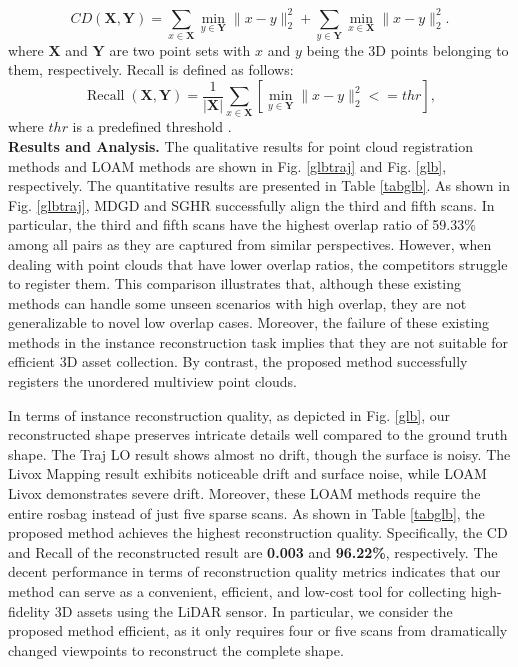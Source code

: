 \begin{equation}
CD\left(\boldsymbol{X}, \boldsymbol{Y}\right)=\sum_{x \in \boldsymbol{X}} \min _{y \in \boldsymbol{Y}}\|x-y\|_2^2+\sum_{y \in \boldsymbol{Y}} \min _{x \in \boldsymbol{X}}\|x-y\|_2^2. \label{cd}
\end{equation} 
where $\boldsymbol{X}$ and $\boldsymbol{Y}$ are two point sets with $x$ and $y$ being the 3D points belonging to them, respectively. Recall is defined as follows:
\begin{equation}
\operatorname{Recall}(\boldsymbol{X}, \boldsymbol{Y})=\frac{1}{|\boldsymbol{X}|} \sum_{x \in \boldsymbol{X}}\left[\min _{y \in \boldsymbol{Y}}\|x-y\|_2^2<=thr\right],
\end{equation}
where $thr$ is a predefined threshold \cite{cd}.
\\
\noindent\textbf{Results and Analysis.}
The qualitative results for point cloud registration methods and LOAM methods are shown in Fig. \ref{glbtraj} and Fig. \ref{glb}, respectively. The quantitative results are presented in Table \ref{tabglb}. As shown in Fig. \ref{glbtraj}, MDGD \cite{mdgd} and SGHR \cite{sghr} successfully align the third and fifth scans. In particular, the third and fifth scans have the highest overlap ratio of 59.33\% among all pairs as they are captured from similar perspectives. However, when dealing with point clouds that have lower overlap ratios, the competitors \cite{mdgd,sghr,se3et,geotransformer,teaser} struggle to register them. This comparison illustrates that, although these existing methods can handle some unseen scenarios with high overlap, they are not generalizable to novel low overlap cases.
Moreover, the failure of these existing methods in the instance reconstruction task implies that they are not suitable for efficient 3D asset collection. By contrast, the proposed method successfully registers the unordered multiview point clouds. 
\par
In terms of instance reconstruction quality, as depicted in Fig. \ref{glb}, our reconstructed shape preserves intricate details well compared to the ground truth shape. The Traj LO \cite{traj} result shows almost no drift, though the surface is noisy. The Livox Mapping \cite{sdk} result exhibits noticeable drift and surface noise, while LOAM Livox \cite{lloam} demonstrates severe drift. Moreover, these LOAM methods require the entire rosbag instead of just five sparse scans. As shown in Table \ref{tabglb}, the proposed method achieves the highest reconstruction quality. Specifically, the CD and Recall of the reconstructed result are \textbf{0.003} and \textbf{96.22\%}, respectively. 
%
The decent performance in terms of reconstruction quality metrics \cite{mending,cd} indicates that our method can serve as a convenient, efficient, and low-cost tool for collecting high-fidelity 3D assets using the LiDAR sensor. 
In particular, we consider the proposed method efficient, as it only requires four or five scans from dramatically changed viewpoints to reconstruct the complete shape.


